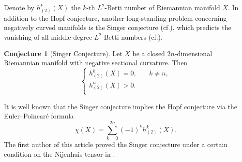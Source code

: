 \documentclass[12pt, twoside]{article}
\theoremstyle{definition}
\numberwithin{equation}{section}
\newtheorem{conjecture}{Conjecture}
\begin{document}
Denote by $h^{k}_{(2)}(X)$ the $k$-th $L^{2}$-Betti number of Riemannian manifold $X$. In addition to the Hopf conjecture, another long-standing problem concerning negatively curved manifolds is the Singer conjecture (cf.\cite[Conjecture 2]{Dod}), which predicts the vanishing of all middle-degree $L^{2}$-Betti numbers (cf.\cite{DX,JX}).  
\begin{conjecture}[Singer Conjecture]
	Let $X$ be a closed $2n$-dimensional Riemannian manifold with negative sectional curvature. Then
	\begin{equation*}
	\left\{
	\begin{aligned}
	h^{k}_{(2)}(X)=0, &\quad k\neq n,\\
	h^{n}_{(2)}(X)>0.& \\
	\end{aligned}  
	\right.
	\end{equation*}	
\end{conjecture}
It is well known that the Singer conjecture implies the Hopf conjecture via the Euler–Poincaré formula
$$\chi(X)=\sum_{k=0}^{2n}(-1)^{k}h_{(2)}^{k}(X).$$
The first author of this article proved the Singer conjecture under a certain condition on the Nijenhuis tensor in \cite{Hua23}.
	
\end{document}
